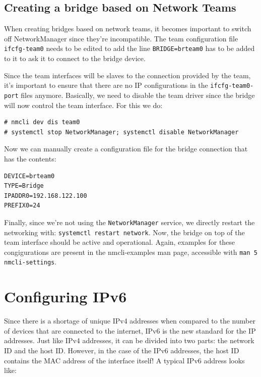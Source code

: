 \subsection{Creating a bridge based on Network Teams}
When creating bridges based on network teams, it becomes important to switch off NetworkManager since they're incompatible. The team configuration file \verb|ifcfg-team0| needs to be edited to add the line \verb|BRIDGE=brteam0| has to be added to it to ask it to connect to the bridge device. 

Since the team interfaces will be slaves to the connection provided by the team, it's important to ensure that there are no IP configurations in the \verb|ifcfg-team0-port| files anymore. Basically, we need to disable the team driver since the bridge will now control the team interface. For this we do:

\vspace{-15pt}
\begin{verbatim}
# nmcli dev dis team0
# systemctl stop NetworkManager; systemctl disable NetworkManager
\end{verbatim}
\vspace{-10pt}	

\noindent


Now we can manually create a configuration file for the bridge connection that has the contents:

\vspace{-15pt}
\begin{verbatim}
DEVICE=brteam0
TYPE=Bridge
IPADDR0=192.168.122.100
PREFIX0=24
\end{verbatim}
\vspace{-10pt}	

\noindent
Finally, since we're not using the \verb|NetworkManager| service, we directly restart the networking with: \verb|systemctl restart network|. Now, the bridge on top of the team interface should be active and operational. Again, examples for these congigurations are present in the nmcli-examples man page, accessible with \verb|man 5 nmcli-settings|. 

\section{Configuring IPv6} 
Since there is a shortage of unique IPv4 addresses when compared to the number of devices that are connected to the internet, IPv6 is the new standard for the IP addresses. Just like IPv4 addresses, it can be divided into two parts: the network ID and the host ID. However, in the case of the IPv6 addresses, the host ID contains the MAC address of the interface itself! A typical IPv6 address looks like:

